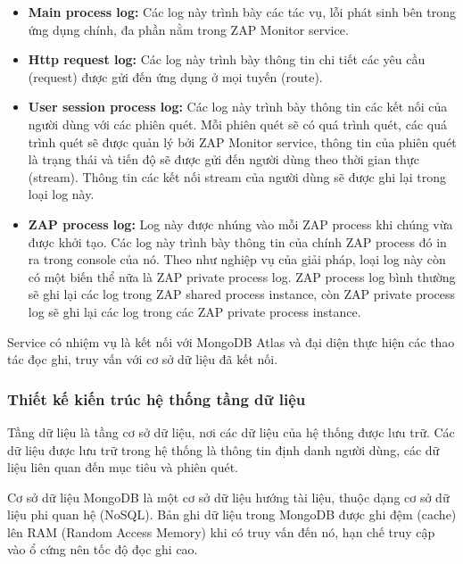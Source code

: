 \begin{itemize}
      \item \textbf{Main process log:} Các log này trình bày các tác vụ, lỗi phát sinh bên trong ứng dụng chính, đa phần nằm trong ZAP Monitor service.
      \item \textbf{Http request log:} Các log này trình bày thông tin chi tiết các yêu cầu (request) được gửi đến ứng dụng ở mọi tuyến (route).
      \item \textbf{User session process log:} Các log này trình bày thông tin các kết nối của người dùng với các phiên quét.
            Mỗi phiên quét sẽ có quá trình quét, các quá trình quét sẽ được quản lý bởi ZAP Monitor service, thông tin của phiên quét là trạng thái và tiến độ sẽ được gửi đến người dùng theo thời gian thực (stream).
            Thông tin các kết nối stream của người dùng sẽ được ghi lại trong loại log này.
      \item \textbf{ZAP process log:} Log này được nhúng vào mỗi ZAP process khi chúng vừa được khởi tạo.
            Các log này trình bày thông tin của chính ZAP process đó in ra trong console của nó.
            Theo như nghiệp vụ của giải pháp, loại log này còn có một biến thể nữa là ZAP private process log.
            ZAP process log bình thường sẽ ghi lại các log trong ZAP shared process instance, còn ZAP private process log sẽ ghi lại các log trong các ZAP private process instance.
\end{itemize}

\tab \tab Service có nhiệm vụ là kết nối với MongoDB Atlas và đại diện thực hiện các thao tác đọc ghi, truy vấn với cơ sở dữ liệu đã kết nối.

\subsubsection{Thiết kế kiến trúc hệ thống tầng dữ liệu}

\tab Tầng dữ liệu là tầng cơ sở dữ liệu, nơi các dữ liệu của hệ thống được lưu trữ.
Các dữ liệu được lưu trữ trong hệ thống là thông tin định danh người dùng, các dữ liệu liên quan đến mục tiêu và phiên quét.
\par

Cơ sở dữ liệu MongoDB là một cơ sở dữ liệu hướng tài liệu, thuộc dạng cơ sở dữ liệu phi quan hệ (NoSQL).
Bản ghi dữ liệu trong MongoDB được ghi đệm (cache) lên RAM (Random Access Memory) khi có truy vấn đến nó, hạn chế truy cập vào ổ cứng nên tốc độ đọc ghi cao.
\par

